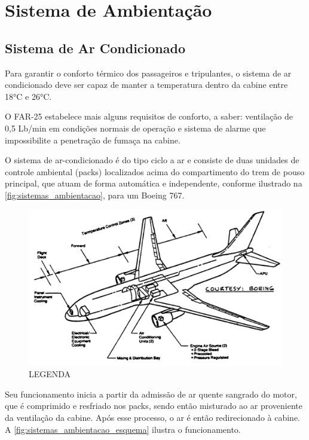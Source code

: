 \section{Sistema de Ambientação}

\subsection{Sistema de Ar Condicionado}

Para garantir o conforto térmico dos passageiros e tripulantes, o sistema de ar condicionado deve ser capaz de manter a temperatura dentro da cabine entre 18°C e 26°C.

O FAR-25 estabelece mais alguns requisitos de conforto, a saber: ventilação de 0,5 Lb/min em condições normais de operação e sistema de alarme que impossibilite a penetração de fumaça na cabine.

O sistema de ar-condicionado é do tipo ciclo a ar e consiste de duas unidades de controle ambiental (packs) localizados acima do compartimento do trem de pouso principal, que atuam de forma automática e independente, conforme ilustrado na \autoref{fig:sistemas_ambientacao}, para um Boeing 767.

\begin{figure}
\centering
\includegraphics{images/parte3/sistemas_ambientacao.png}
\caption{LEGENDA}
\label{fig:sistemas_ambientacao}
\end{figure}

Seu funcionamento inicia a partir da admissão de ar quente sangrado do motor, que é comprimido e resfriado nos packs, sendo então misturado ao ar proveniente da ventilação da cabine.
Após esse processo, o ar é então redirecionado à cabine.
A \autoref{fig:sistemas_ambientacao_esquema} ilustra o funcionamento.

